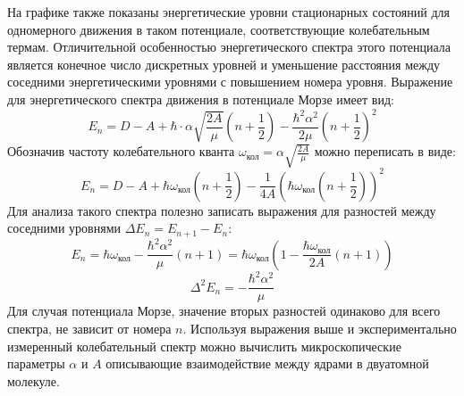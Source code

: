 \documentclass[a4paper, 12pt]{article}
\begin{document}
На графике также показаны энергетические уровни стационарных
состояний для одномерного движения в таком потенциале, соответствующие колебательным термам. Отличительной особенностью энергетического спектра этого потенциала является конечное число дискретных уровней и уменьшение расстояния между соседними энергетическими уровнями с повышением номера уровня. Выражение для энергетического спектра движения в потенциале Морзе имеет вид:
\begin{equation}
E_n=D-A+\hbar\cdot{\alpha}\sqrt{\frac{2A}{\mu}}(n+\frac{1}{2})-\frac{\hbar^2\alpha^2}{2\mu}(n+\frac{1}{2})^2
\end{equation}
Обозначив частоту колебательного кванта $\omega_{\text{кол}}=\alpha\sqrt{\frac{2A}{\mu}}$ можно переписать в виде:
\begin{equation}
	E_n=D-A+\hbar \omega_{\text{кол}}(n+\frac{1}{2})-\frac{1}{4A}(\hbar \omega_{\text{кол}}(n+\frac{1}{2}))^2
\end{equation}
	Для анализа такого спектра полезно записать выражения для разностей между соседними уровнями $\Delta E_n=E_{n+1}-E_n$:
\begin{equation}
	E_n=\hbar \omega_{\text{кол}}-\frac{\hbar^2\alpha^2}{\mu}(n+1)=\hbar \omega_{\text{кол}}(1-\frac{\hbar\omega_{\text{кол}}}{2A}(n+1))
\end{equation}
\begin{equation}
	\Delta^2E_n=-\frac{\hbar^2\alpha^2}{\mu}
\end{equation}
	Для случая потенциала Морзе, значение вторых разностей одинаково для всего спектра, не зависит от номера $n$.  Используя выражения выше и экспериментально измеренный колебательный спектр можно вычислить микроскопические параметры $\alpha$ и $A$ описывающие взаимодействие между ядрами в двуатомной молекуле.
\end{document}
